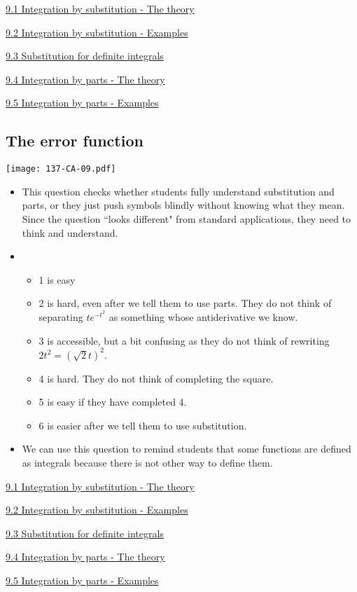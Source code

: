 \documentclass[11pt]{article}
\newcommand{\nl}{\hfill \vspace{-1.1\baselineskip}} %
\newcommand{\vi}{\hspace{8mm} \href{https://www.youtube.com/watch?v=6IiHC3-E3kQ&list=PLlwePzQY_wW_DPAQSBjQmMs0hF8T7yVkF&index=1}{9.1 Integration by substitution - The theory}}
\newcommand{\vii}{\hspace{8mm} \href{https://www.youtube.com/watch?v=dS50LonV_ms&list=PLlwePzQY_wW_DPAQSBjQmMs0hF8T7yVkF&index=2}{9.2 Integration by substitution - Examples}}
\newcommand{\viii}{\hspace{8mm} \href{https://www.youtube.com/watch?v=9WkYb_fRoG0&list=PLlwePzQY_wW_DPAQSBjQmMs0hF8T7yVkF&index=3}{9.3 Substitution for definite integrals}}
\newcommand{\viv}{\hspace{8mm} \href{https://www.youtube.com/watch?v=taKIe3Ui3oI&list=PLlwePzQY_wW_DPAQSBjQmMs0hF8T7yVkF&index=4}{9.4 Integration by parts - The theory}}
\newcommand{\vv}{\hspace{8mm} \href{https://www.youtube.com/watch?v=15DJgDvMpTE&list=PLlwePzQY_wW_DPAQSBjQmMs0hF8T7yVkF&index=5}{9.5 Integration by parts - Examples}}
\begin{document}
\begin{videos}
\vi

\vii

\viii

\viv

\vv
\end{videos}

\newpage
\subsection{The error function}

\begin{center}
{ \texttt{[image: 137-CA-09.pdf]}} 
\end{center}

\begin{comments}
\nl
	\begin{itemize}
		\item This question checks whether students fully understand substitution and parts, or they just push symbols blindly without knowing what they mean.  Since the question ``looks different" from standard applications, they need to think and understand.
		\item	
			\begin{itemize}
				\item 1 is easy
				\item 2 is hard, even after we tell them to use parts.  They do not think of separating  $te^{-t^2}$ as something whose antiderivative we know.  
				\item 3 is accessible, but a bit confusing as they do not think of rewriting $2t^2 = (\sqrt{2} t)^2$.
				\item 4 is hard.  They do not think of completing the square.
				\item 5 is easy if they have completed 4.
				\item 6 is easier after we tell them to use substitution.
			\end{itemize}
		\item We can use this question to remind students that some functions are defined as integrals because there is not other way to define them.
	\end{itemize}
\end{comments}

\begin{videos}
\vi

\vii

\viii

\viv

\vv
\end{videos}
\end{document}
